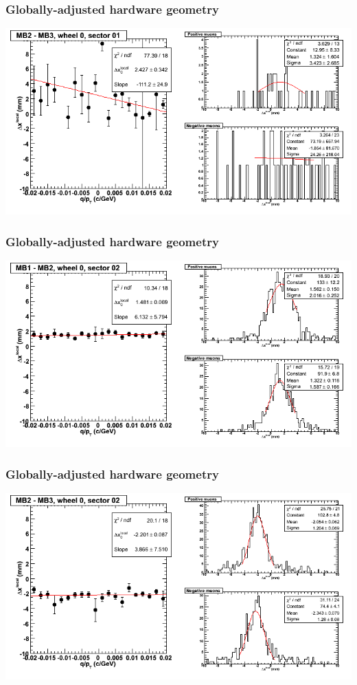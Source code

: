 \documentclass[compress]{beamer}
\begin{document}
\begin{frame}
\frametitle{Globally-adjusted hardware geometry}
\includegraphics[width=\linewidth]{NOV4_segdiffs_HW/dt13_resid_C_01_23.png}
\end{frame}

\begin{frame}
\frametitle{Globally-adjusted hardware geometry}
\includegraphics[width=\linewidth]{NOV4_segdiffs_HW/dt13_resid_C_02_12.png}
\end{frame}

\begin{frame}
\frametitle{Globally-adjusted hardware geometry}
\includegraphics[width=\linewidth]{NOV4_segdiffs_HW/dt13_resid_C_02_23.png}
\end{frame}
\end{document}
